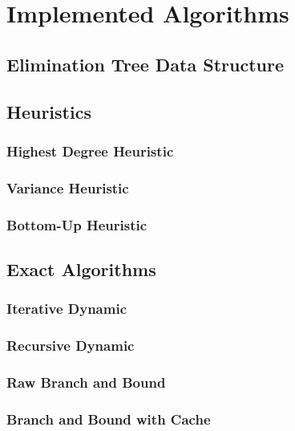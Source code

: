 \section{Implemented Algorithms}
\subsection{Elimination Tree Data Structure}
\subsection{Heuristics}
\subsubsection{Highest Degree Heuristic}
\subsubsection{Variance Heuristic}
\subsubsection{Bottom-Up Heuristic}
\subsection{Exact Algorithms}
\subsubsection{Iterative Dynamic}
\subsubsection{Recursive Dynamic}
\subsubsection{Raw Branch and Bound}
\subsubsection{Branch and Bound with Cache}
